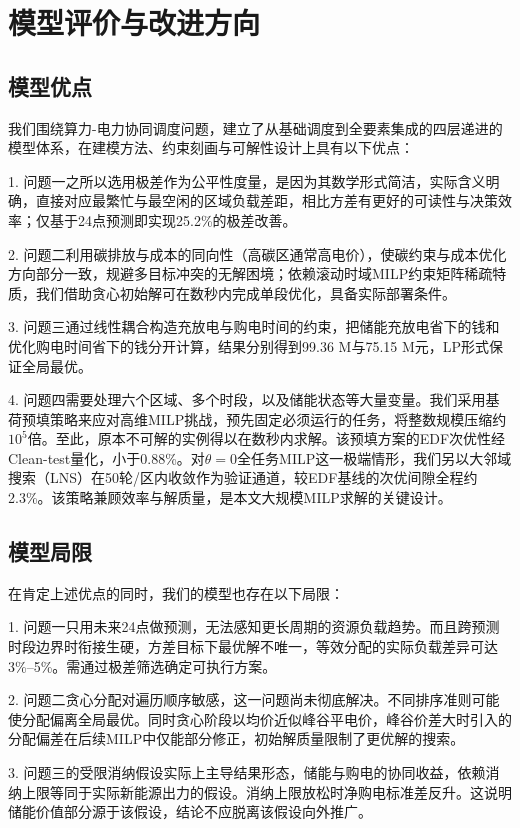 \section{模型评价与改进方向}

\subsection{模型优点}

我们围绕算力-电力协同调度问题，建立了从基础调度到全要素集成的四层递进的模型体系，在建模方法、约束刻画与可解性设计上具有以下优点：

1. 问题一之所以选用极差作为公平性度量，是因为其数学形式简洁，实际含义明确，直接对应最繁忙与最空闲的区域负载差距，相比方差有更好的可读性与决策效率；仅基于24点预测即实现25.2\%的极差改善。

2. 问题二利用碳排放与成本的同向性（高碳区通常高电价），使碳约束与成本优化方向部分一致，规避多目标冲突的无解困境；依赖滚动时域MILP约束矩阵稀疏特质，我们借助贪心初始解可在数秒内完成单段优化，具备实际部署条件。

3. 问题三通过线性耦合构造充放电与购电时间的约束，把储能充放电省下的钱和优化购电时间省下的钱分开计算，结果分别得到99.36 M与75.15 M元，LP形式保证全局最优。

4. 问题四需要处理六个区域、多个时段，以及储能状态等大量变量。我们采用基荷预填策略来应对高维MILP挑战，预先固定必须运行的任务，将整数规模压缩约$10^5$倍。至此，原本不可解的实例得以在数秒内求解。该预填方案的EDF次优性经Clean-test量化，小于0.88\%。对$\theta=0$全任务MILP这一极端情形，我们另以大邻域搜索（LNS）在50轮/区内收敛作为验证通道，较EDF基线的次优间隙全程约2.3\%。该策略兼顾效率与解质量，是本文大规模MILP求解的关键设计。

\subsection{模型局限}

在肯定上述优点的同时，我们的模型也存在以下局限：

1. 问题一只用未来24点做预测，无法感知更长周期的资源负载趋势。而且跨预测时段边界时衔接生硬，方差目标下最优解不唯一，等效分配的实际负载差异可达3\%--5\%。需通过极差筛选确定可执行方案。

2. 问题二贪心分配对遍历顺序敏感，这一问题尚未彻底解决。不同排序准则可能使分配偏离全局最优。同时贪心阶段以均价近似峰谷平电价，峰谷价差大时引入的分配偏差在后续MILP中仅能部分修正，初始解质量限制了更优解的搜索。

3. 问题三的受限消纳假设实际上主导结果形态，储能与购电的协同收益，依赖消纳上限等同于实际新能源出力的假设。消纳上限放松时净购电标准差反升。这说明储能价值部分源于该假设，结论不应脱离该假设向外推广。

